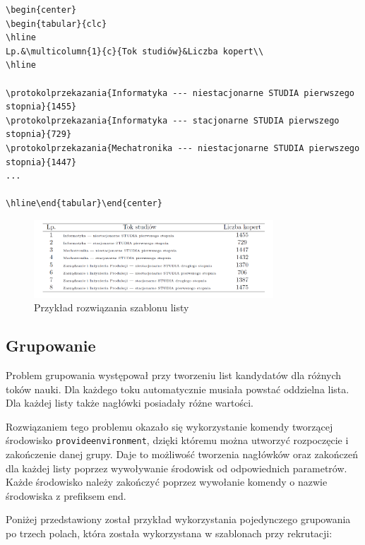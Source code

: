 \begin{lstlisting}
\begin{center}
\begin{tabular}{clc}
\hline
Lp.&\multicolumn{1}{c}{Tok studiów}&Liczba kopert\\
\hline

\protokolprzekazania{Informatyka --- niestacjonarne STUDIA pierwszego stopnia}{1455}
\protokolprzekazania{Informatyka --- stacjonarne STUDIA pierwszego stopnia}{729}
\protokolprzekazania{Mechatronika --- niestacjonarne STUDIA pierwszego stopnia}{1447}
...

\hline\end{tabular}\end{center}
\end{lstlisting}

\begin{figure}[h]
    \centering
    \label{fig:lista}
    \includegraphics[width=0.8\textwidth]{rys/szablony/lista.png}
    \caption{Przykład rozwiązania szablonu listy}
\end{figure}


\subsection{Grupowanie}

Problem grupowania występował przy tworzeniu list kandydatów dla różnych toków nauki. Dla każdego toku automatycznie musiała powstać oddzielna lista. Dla każdej listy także nagłówki posiadały różne wartości. 
\par Rozwiązaniem tego problemu okazało się wykorzystanie komendy tworzącej środowisko \texttt{provideenvironment}, dzięki któremu można utworzyć rozpoczęcie i zakończenie danej grupy. Daje to możliwość tworzenia nagłówków oraz zakończeń dla każdej listy poprzez wywoływanie środowisk od odpowiednich parametrów. Każde środowisko należy zakończyć poprzez wywołanie komendy o nazwie środowiska z prefiksem end.
\par
Poniżej przedstawiony został przykład wykorzystania pojedynczego grupowania po trzech polach, która została wykorzystana w szablonach przy rekrutacji:

